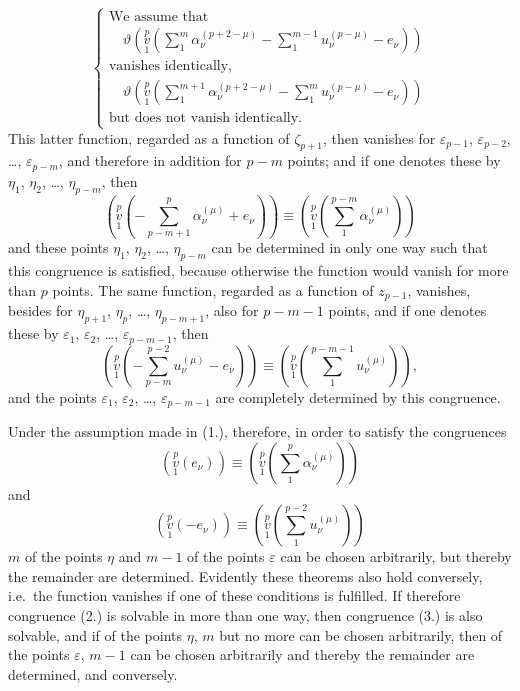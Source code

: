 \documentclass{article}
\begin{document}
\[
\tag{(1.)}
\left\{
\begin{array}{l}
\text{We assume that} \\
\quad \vartheta\left(\overset{p}{\underset{1}{v}}\left(\sum_1^m \alpha_\nu^{(p+2-\mu)} - \sum_1^{m-1} u_\nu^{(p-\mu)} - e_\nu\right)\right) \\
\text{vanishes identically,} \\
\quad \vartheta\left(\overset{p}{\underset{1}{v}}\left(\sum_1^{m+1} \alpha_\nu^{(p+2-\mu)} - \sum_1^m u_\nu^{(p-\mu)} - e_\nu\right)\right) \\
\text{but does not vanish identically.}
\end{array}
\right.
\]
This latter function, regarded as a function of $\zeta_{p+1}$, then vanishes for $\varepsilon_{p-1}$, $\varepsilon_{p-2}$, \dots, $\varepsilon_{p-m}$, and therefore in addition for $p-m$ points; and if one denotes these by $\eta_1$, $\eta_2$, \dots, $\eta_{p-m}$, then
\[
\left(\overset{p}{\underset{1}{v}}\left(-\sum_{p-m+1}^p \alpha_\nu^{(\mu)} + e_\nu\right)\right) \equiv \left(\overset{p}{\underset{1}{v}}\left(\sum_1^{p-m} \alpha_\nu^{(\mu)}\right)\right)
\]
and these points $\eta_1$, $\eta_2$, \dots, $\eta_{p-m}$ can be determined in only one way such that this congruence is satisfied, because otherwise the function would vanish for more than $p$ points. The same function, regarded as a function of $z_{p-1}$, vanishes, besides for $\eta_{p+1}$, $\eta_p$, \dots, $\eta_{p-m+1}$, also for $p-m-1$ points, and if one denotes these by $\varepsilon_1$, $\varepsilon_2$, \dots, $\varepsilon_{p-m-1}$, then
\[
\left(\overset{p}{\underset{1}{v}}\left(-\sum_{p-m}^{p-2} u_\nu^{(\mu)} - e_\nu\right)\right) \equiv \left(\overset{p}{\underset{1}{v}}\left(\sum_1^{p-m-1} u_\nu^{(\mu)}\right)\right),
\]
and the points $\varepsilon_1$, $\varepsilon_2$, \dots, $\varepsilon_{p-m-1}$ are completely determined by this congruence.

Under the assumption made in (1.), therefore, in order to satisfy the congruences
\[
\tag{(2.)}
\left(\overset{p}{\underset{1}{v}}(e_\nu)\right) \equiv \left(\overset{p}{\underset{1}{v}}\left(\sum_1^p \alpha_\nu^{(\mu)}\right)\right)
\]
and
\[
\tag{(3.)}
\left(\overset{p}{\underset{1}{v}}(-e_\nu)\right) \equiv \left(\overset{p}{\underset{1}{v}}\left(\sum_1^{p-2} u_\nu^{(\mu)}\right)\right)
\]
$m$ of the points $\eta$ and $m-1$ of the points $\varepsilon$ can be chosen arbitrarily, but thereby the remainder are determined. Evidently these theorems also hold conversely, i.e.\ the function vanishes if one of these conditions is fulfilled. If therefore congruence (2.) is solvable in more than one way, then congruence (3.) is also solvable, and if of the points $\eta$, $m$ but no more can be chosen arbitrarily, then of the points $\varepsilon$, $m-1$ can be chosen arbitrarily and thereby the remainder are determined, and conversely.
\end{document}
